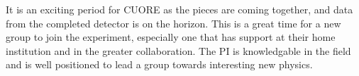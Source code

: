 It is an exciting period for CUORE as the pieces are coming together, and data from the completed detector is on the horizon. This is a great time for a new group to join the experiment, especially one that has support at their home institution and in the greater collaboration. The PI is knowledgable in the field and is well positioned to lead a group towards interesting new physics. 
